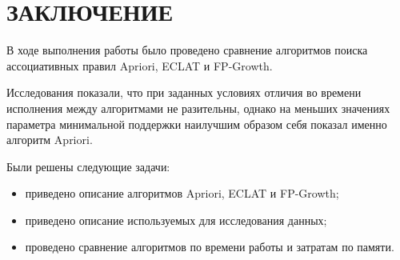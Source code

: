 \section*{ЗАКЛЮЧЕНИЕ}
В ходе выполнения работы было проведено сравнение алгоритмов поиска ассоциативных правил Apriori, ECLAT и FP-Growth.

Исследования показали, что при заданных условиях отличия во времени исполнения между алгоритмами не разительны, однако на меньших значениях параметра минимальной поддержки наилучшим образом себя показал именно алгоритм Apriori.

Были решены следующие задачи:
\begin{itemize}
	\item приведено описание алгоритмов Apriori, ECLAT и FP-Growth;
	\item приведено описание используемых для исследования данных;
	\item проведено сравнение алгоритмов по времени работы и затратам по памяти.
\end{itemize}

\pagebreak